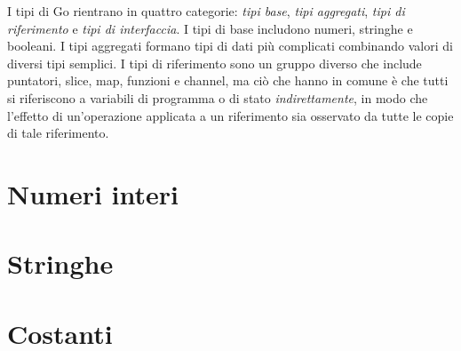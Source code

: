 I tipi di Go rientrano in quattro categorie: \textit{tipi base}, \textit{tipi aggregati}, \textit{tipi di riferimento} e \textit{tipi di interfaccia}.
I tipi di base includono numeri, stringhe e booleani.
I tipi aggregati formano tipi di dati più complicati combinando valori di diversi tipi semplici.
I tipi di riferimento sono un gruppo diverso che include puntatori, slice, map, funzioni e channel, ma ciò che hanno in comune è che tutti si riferiscono a variabili di programma o di stato \textit{indirettamente}, in modo che l'effetto di un'operazione applicata a un riferimento sia osservato da tutte le copie di tale riferimento.


\section{Numeri interi}
\label{sec:numeri_interi}%



\section{Stringhe}
\label{sec:stringhe}


\section{Costanti}
\label{sec:costanti}%


